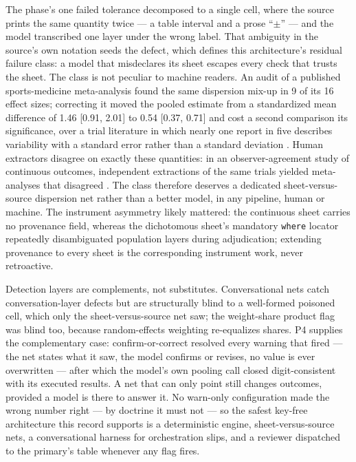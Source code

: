 \documentclass[11pt]{article}
\begin{document}
The phase's one failed tolerance decomposed to a single cell, where the source prints the same quantity twice --- a table interval and a prose ``$\pm$'' --- and the model transcribed one layer under the wrong label. That ambiguity in the source's own notation seeds the defect, which defines this architecture's residual failure class: a model that misdeclares its sheet escapes every check that trusts the sheet. The class is not peculiar to machine readers. An audit of a published sports-medicine meta-analysis found the same dispersion mix-up in 9 of its 16 effect sizes; correcting it moved the pooled estimate from a standardized mean difference of 1.46 [0.91, 2.01] to 0.54 [0.37, 0.71] and cost a second comparison its significance, over a trial literature in which nearly one report in five describes variability with a standard error rather than a standard deviation \citep{sandercock2024mixup}. Human extractors disagree on exactly these quantities: in an observer-agreement study of continuous outcomes, independent extractions of the same trials yielded meta-analyses that disagreed \citep{tendal2009disagreements}. The class therefore deserves a dedicated sheet-versus-source dispersion net rather than a better model, in any pipeline, human or machine. The instrument asymmetry likely mattered: the continuous sheet carries no provenance field, whereas the dichotomous sheet's mandatory \texttt{where} locator repeatedly disambiguated population layers during adjudication; extending provenance to every sheet is the corresponding instrument work, never retroactive. 

Detection layers are complements, not substitutes. Conversational nets catch conversation-layer defects but are structurally blind to a well-formed poisoned cell, which only the sheet-versus-source net saw; the weight-share product flag was blind too, because random-effects weighting re-equalizes shares. P4 supplies the complementary case: confirm-or-correct resolved every warning that fired --- the net states what it saw, the model confirms or revises, no value is ever overwritten --- after which the model's own pooling call closed digit-consistent with its executed results. A net that can only point still changes outcomes, provided a model is there to answer it. No warn-only configuration made the wrong number right --- by doctrine it must not --- so the safest key-free architecture this record supports is a deterministic engine, sheet-versus-source nets, a conversational harness for orchestration slips, and a reviewer dispatched to the primary's table whenever any flag fires.
\end{document}
